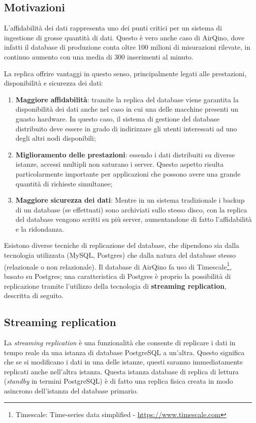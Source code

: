 \subsection{Motivazioni}\label{ssec:replica-motivazioni}
L'affidabilità dei dati rappresenta uno dei punti critici per un sistema di ingestione di grosse quantità di dati. Questo è vero anche caso di AirQino, dove infatti il database di produzione conta oltre 100 milioni di misurazioni rilevate, in continuo aumento con una media di 300 inserimenti al minuto.

La replica offrire vantaggi in questo senso, principalmente legati alle prestazioni, disponibilità e sicurezza dei dati:
\begin{enumerate}
  \item \textbf{Maggiore affidabilità}: tramite la replica del database viene garantita la disponibilità dei dati anche nel caso in cui una delle macchine presenti un guasto hardware. In questo caso, il sistema di gestione del database distribuito deve essere in grado di indirizzare gli utenti interessati ad uno degli altri nodi disponibili;
  \item \textbf{Miglioramento delle prestazioni}: essendo i dati distribuiti su diverse istanze, accessi multipli non saturano i server. Questo aspetto risulta particolarmente importante per applicazioni che possono avere una grande quantità di richieste simultanee;
  \item \textbf{Maggiore sicurezza dei dati}: Mentre in un sistema tradizionale i backup di un database (se effettuati) sono archiviati sullo stesso disco, con la replica del database vengono scritti su più server, aumentandone di fatto l'affidabilità e la ridondanza.
\end{enumerate}

Esistono diverse tecniche di replicazione del database, che dipendono sia dalla tecnologia utilizzata (MySQL, Postgres) che dalla natura del database stesso (relazionale o non relazionale). Il database di AirQino fa uso di Timescale\footnote{Timescale: Time-series data simplified - \url{https://www.timescale.com}}, basato su Postgres; una caratteristica di Postgres è proprio la possibilità di replicazione tramite l'utilizzo della tecnologia di \textbf{streaming replication}, descritta di seguito.

\subsection{Streaming replication}\label{ssec:streaming-replication}
La \textit{streaming replication} è una funzionalità che consente di replicare i dati in tempo reale da una istanza di database PostgreSQL a un'altra. Questo significa che se si modificano i dati in una delle istanze, questi saranno immediatamente replicati anche nell'altra istanza. Questa istanza database di replica di lettura (\textit{standby} in termini PostgreSQL) è di fatto una replica fisica creata in modo asincrono dell'istanza del database primario.

